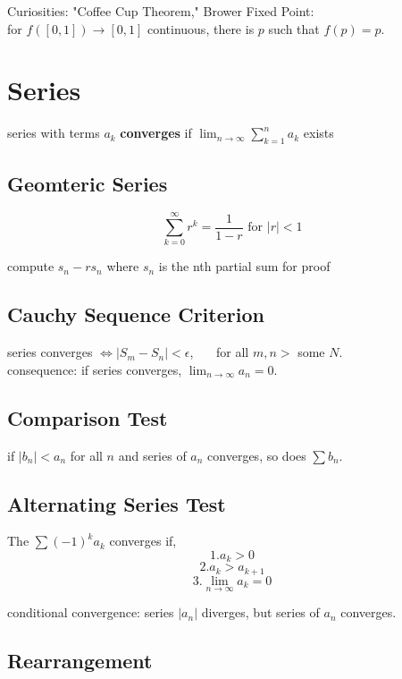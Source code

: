 \documentclass[12pt]{article}
\begin{document}
\begin{itemize}
\begin{enumerate}
\end{enumerate}


Curiosities:
"Coffee Cup Theorem," Brower Fixed Point: \\
for $f([0, 1]) \rightarrow [0, 1]$ continuous, there is $p$ such that $f(p) = p$.

\section*{Series}

series with terms $a_k$ \textbf{converges} if $\lim_{n \rightarrow \infty} \sum_{k=1}^n a_k$ exists


\subsection*{Geomteric Series}


$$\sum_{k=0}^\infty r^k = \frac{1}{1-r} \text{ for } |r| < 1$$

\textcolor[gray]{0.5}{compute $s_n - rs_n$ where $s_n$ is the nth partial sum for proof}

\subsection*{Cauchy Sequence Criterion}

series converges $\iff |S_m - S_n| < \epsilon$, \ \ \  for all $m, n > $ some $N$.\\

\noindent consequence: if series converges, $\lim_{n \rightarrow \infty} a_n = 0$.

\subsection*{Comparison Test}

if $|b_n| < a_n$ for all $n$ and series of $a_n$ converges, so does $\sum b_n$.



\subsection*{Alternating Series Test}

The $\sum (-1)^k a_k$ converges if, 
$$1. a_k > 0$$
$$2. a_k > a_{k+1}$$
$$3. \lim_{n \rightarrow \infty} a_k = 0$$


conditional convergence: series $|a_n|$ diverges, but series of $a_n$ converges.

\subsection*{Rearrangement}


\end{itemize}
\end{document}
